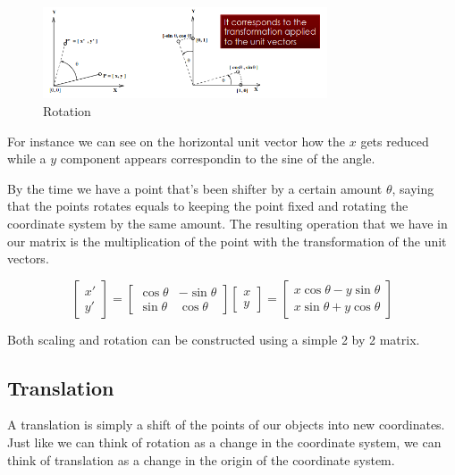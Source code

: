 \begin{figure}[ht]
    \centering
    \includegraphics[width=0.75\textwidth]{Figures/rotation.png}
    \caption{Rotation}
    \label{fig:rotation}
\end{figure}

For instance we can see on the horizontal unit vector how the \(x\) gets reduced while a \(y\) component appears correspondin to the sine of the angle.

By the time we have a point that's been shifter by a certain amount \(\theta\), saying that the points rotates equals to keeping the point fixed and rotating the coordinate system by the same amount. The resulting operation that we have in our matrix is the multiplication of the point with the transformation of the unit vectors.

\[
    \begin{bmatrix}
        x' \\
        y'
        \end{bmatrix}
        =
        \begin{bmatrix}
        \cos\theta & -\sin\theta \\
        \sin\theta & \cos\theta
        \end{bmatrix}
        \begin{bmatrix}
        x \\
        y
        \end{bmatrix}
        =
        \begin{bmatrix}
        x \cos\theta - y \sin\theta \\
        x \sin\theta + y \cos\theta
        \end{bmatrix}    
\]

Both scaling and rotation can be constructed using a simple 2 by 2 matrix.
\subsection{Translation}

A translation is simply a shift of the points of our objects into new coordinates.
Just like we can think of rotation as a change in the coordinate system, we can think of translation as a change in the origin of the coordinate system.

